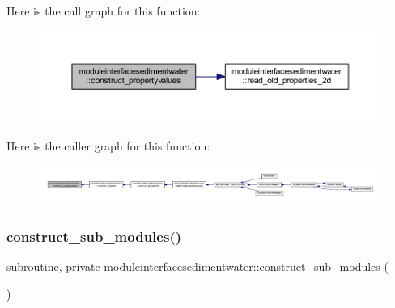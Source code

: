 Here is the call graph for this function\+:\nopagebreak
\begin{figure}[H]
\begin{center}
\leavevmode
\includegraphics[width=350pt]{namespacemoduleinterfacesedimentwater_a9e41247ffadd3cbbaf6315c7a890f885_cgraph}
\end{center}
\end{figure}
Here is the caller graph for this function\+:\nopagebreak
\begin{figure}[H]
\begin{center}
\leavevmode
\includegraphics[width=350pt]{namespacemoduleinterfacesedimentwater_a9e41247ffadd3cbbaf6315c7a890f885_icgraph}
\end{center}
\end{figure}
\mbox{\label{namespacemoduleinterfacesedimentwater_a95c6fc880171b2c2d476ac8adcb366e0}} 
\subsubsection{\texorpdfstring{construct\+\_\+sub\+\_\+modules()}{construct\_sub\_modules()}}
{\footnotesize\ttfamily subroutine, private moduleinterfacesedimentwater\+::construct\+\_\+sub\+\_\+modules (\begin{DoxyParamCaption}{ }\end{DoxyParamCaption})\hspace{0.3cm}{\ttfamily [private]}}

